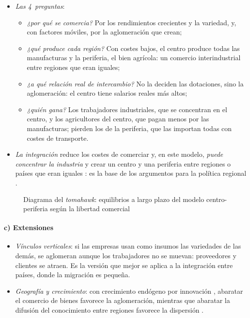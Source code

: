 \documentclass[11pt]{article}
\begin{document}
\begin{itemize}
\item \emph{Las 4~preguntas}:
  \begin{itemize}
  \item \emph{¿por qué se comercia?} Por los rendimientos crecientes y la variedad, y, con factores móviles, por la aglomeración que crean;
  \item \emph{¿qué produce cada región?} Con costes bajos, el centro produce todas las manufacturas y la periferia, el bien agrícola: un comercio interindustrial entre regiones que eran iguales;
  \item \emph{¿a qué relación real de intercambio?} No la deciden las dotaciones, sino la aglomeración: el centro tiene salarios reales más altos;
  \item \emph{¿quién gana?} Los trabajadores industriales, que se concentran en el centro, y los agricultores del centro, que pagan menos por las manufacturas; pierden los de la periferia, que las importan todas con costes de transporte.
  \end{itemize}
\item \emph{La integración} reduce los costes de comerciar y, en este modelo, \emph{puede concentrar la industria} y crear un centro y una periferia entre regiones o países que eran iguales : es la base de los argumentos para la política regional .
\end{itemize}

\begin{figure}[H]
\centering
\caption{Diagrama del \emph{tomahawk}: equilibrios a largo plazo del modelo centro-periferia según la libertad comercial}\label{fig:tomahawk}
\end{figure}

\paragraph{c) Extensiones}

\begin{itemize}
\item \emph{Vínculos verticales}\nocite{Venables1996Equilibrium}: si las empresas usan como insumos las variedades de las demás, se aglomeran aunque los trabajadores no se muevan: proveedores y clientes se atraen. Es la versión que mejor se aplica a la integración entre países, donde la migración es pequeña.
\item \emph{Geografía y crecimiento}\nocite{BaldwinForslid2000Core}: con crecimiento endógeno por innovación\nocite{Romer1990Endogenous} , abaratar el comercio de bienes favorece la aglomeración, mientras que abaratar la difusión del conocimiento entre regiones favorece la dispersión .
\end{itemize}
\end{document}
